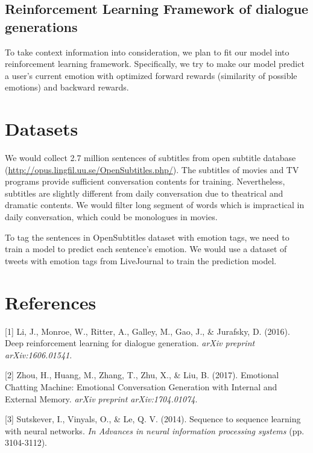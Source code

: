 \documentclass{article}
\begin{document}
\subsection{Reinforcement Learning Framework of dialogue generations}
To take context information into consideration, we plan to fit our model into reinforcement learning framework. Specifically, we try to make our model predict a user's current emotion with optimized forward rewards (similarity of possible emotions) and backward rewards. 



\section{Datasets}
We would collect 2.7 million sentences of subtitles from open subtitle database (\url{http://opus.lingfil.uu.se/OpenSubtitles.php/}). The subtitles of movies and TV programs provide sufficient conversation contents for training. Nevertheless, subtitles are slightly different from daily conversation due to theatrical and dramatic contents. We would filter long segment of words which is impractical in daily conversation, which could be monologues in movies. \par

To tag the sentences in OpenSubtitles dataset with emotion tags, we need to train a model to predict each sentence’s emotion. We would use a dataset of tweets with emotion tags from LiveJournal to train the prediction model. 





\section*{References}

[1] Li, J., Monroe, W., Ritter, A., Galley, M., Gao, J., \& Jurafsky, D. (2016). Deep reinforcement learning for dialogue generation. {\it arXiv preprint arXiv:1606.01541}.


[2] Zhou, H., Huang, M., Zhang, T., Zhu, X., \& Liu, B. (2017). Emotional Chatting Machine: Emotional Conversation Generation with Internal and External Memory. {\it arXiv preprint arXiv:1704.01074}.

[3] Sutskever, I., Vinyals, O., \& Le, Q. V. (2014). Sequence to sequence learning with neural networks. { \it In Advances in neural information processing systems} (pp. 3104-3112).
\end{document}

